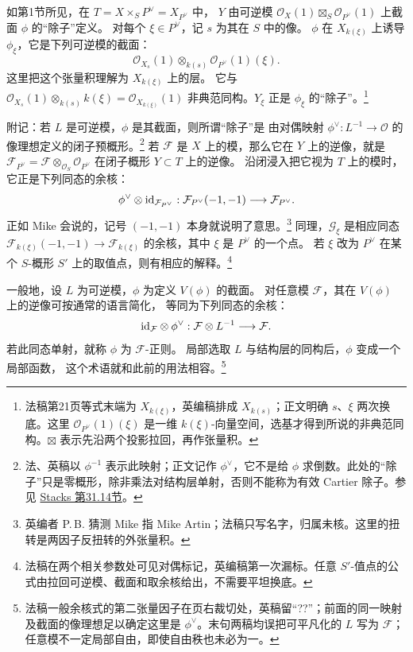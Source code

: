 \begingroup
\def\OO{\mathcal O}\def\FF{\mathcal F}\def\GG{\mathcal G}
\def\PP{\mathbf P}\def\calP{\mathcal P}\def\dd{\delta}
\def\Div{\operatorname{Div}}\def\depth{\operatorname{depth}}
\def\pr{\operatorname{pr}}\def\coker{\operatorname{coker}}
如第1节所见，在 $T=X\times_S P^\vee=X_{P^\vee}$ 中，
$Y$ 由可逆模 $\OO_X(1)\boxtimes_S\OO_{P^\vee}(1)$ 上截面 $\phi$ 的“除子”定义。
对每个 $\xi\in P^\vee$，记 $s$ 为其在 $S$ 中的像。
$\phi$ 在 $X_{k(\xi)}$ 上诱导 $\phi_\xi$，它是下列可逆模的截面：
\[
 \OO_{X_s}(1)\otimes_{k(s)}\OO_{P^\vee}(1)(\xi).
\]
这里把这个张量积理解为 $X_{k(\xi)}$ 上的层。
它与 $\OO_{X_s}(1)\otimes_{k(s)}k(\xi)=\OO_{X_{k(\xi)}}(1)$
非典范同构。$Y_\xi$ 正是 $\phi_\xi$ 的“除子”。\footnote{法稿第21页等式末端为 $X_{k(\xi)}$，英编稿排成 $X_{k(s)}$；正文明确 $s$、$\xi$ 两次换底。这里 $\OO_{P^\vee}(1)(\xi)$ 是一维 $k(\xi)$-向量空间，选基才得到所说的非典范同构。$\boxtimes$ 表示先沿两个投影拉回，再作张量积。}

附记：若 $L$ 是可逆模，$\phi$ 是其截面，则所谓“除子”是
由对偶映射 $\phi^\vee:L^{-1}\to\OO$ 的像理想定义的闭子预概形。\footnote{法、英稿以 $\phi^{-1}$ 表示此映射；正文记作 $\phi^\vee$，它不是给 $\phi$ 求倒数。此处的“除子”只是零概形，除非乘法对结构层单射，否则不能称为有效 Cartier 除子。参见 \href{https://stacks.math.columbia.edu/tag/01WQ}{Stacks 第31.14节}。}
若 $\FF$ 是 $X$ 上的模，那么它在 $Y$ 上的逆像，就是
$\FF_{P^\vee}=\FF\otimes_{\OO_S}\OO_{P^\vee}$ 在闭子概形 $Y\subset T$ 上的逆像。
沿闭浸入把它视为 $T$ 上的模时，它正是下列同态的余核：
\[
 \phi^\vee\otimes\id_{\FF_{P^\vee}}:
 \FF_{P^\vee}(-1,-1)\longrightarrow\FF_{P^\vee}.
\]
正如 Mike 会说的，记号 $(-1,-1)$ 本身就说明了意思。\footnote{英编者 P.\,B. 猜测 Mike 指 Mike Artin；法稿只写名字，归属未核。这里的扭转是两因子反扭转的外张量积。}
同理，$\GG_\xi$ 是相应同态
$\FF_{k(\xi)}(-1,-1)\to\FF_{k(\xi)}$ 的余核，其中 $\xi$ 是 $P^\vee$ 的一个点。
若 $\xi$ 改为 $P^\vee$ 在某个 $S$-概形 $S'$ 上的取值点，则有相应的解释。\footnote{法稿在两个相关参数处可见对偶标记，英编稿第一次漏标。任意 $S'$-值点的公式由拉回可逆模、截面和取余核给出，不需要平坦换底。}

一般地，设 $L$ 为可逆模，$\phi$ 为定义 $V(\phi)$ 的截面。
对任意模 $\FF$，其在 $V(\phi)$ 上的逆像可按通常的语言简化，
等同为下列同态的余核：
\[
 \id_{\FF}\otimes\phi^\vee:\FF\otimes L^{-1}\longrightarrow\FF .
\]
若此同态单射，就称 $\phi$ 为 $\FF$-正则。
局部选取 $L$ 与结构层的同构后，$\phi$ 变成一个局部函数，
这个术语就和此前的用法相容。\footnote{法稿一般余核式的第二张量因子在页右裁切处，英稿留“??”；前面的同一映射及截面的像理想足以确定这里是 $\phi^\vee$。末句两稿均误把可平凡化的 $L$ 写为 $\FF$；任意模不一定局部自由，即使自由秩也未必为一。}

